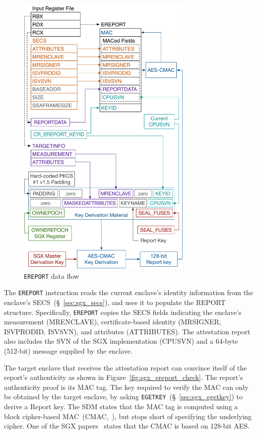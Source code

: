\begin{figure}[hbt]
  \centering
  \includegraphics[width=85mm]{figures/sgx_ereport.pdf}
  \caption{
    \texttt{EREPORT} data flow
  }
  \label{fig:sgx_ereport}
\end{figure}

The \texttt{EREPORT} instruction reads the current enclave's identity
information from the enclave's SECS~(\S~\ref{sec:sgx_secs}), and uses it to
populate the REPORT structure. Specifically, \texttt{EREPORT} copies the
SECS fields indicating the enclave's measurement (MRENCLAVE), certificate-based
identity (MRSIGNER, ISVPRODID, ISVSVN), and attributes (ATTRIBUTES). The
attestation report also includes the SVN of the SGX implementation (CPUSVN)
and a 64-byte (512-bit) message supplied by the enclave.


The target enclave that receives the attestation report can convince itself of
the report's authenticity as shown in Figure~\ref{fig:sgx_ereport_check}. The
report's authenticity proof is its MAC tag. The key required to verify the MAC
can only be obtained by the target enclave, by asking
\texttt{EGETKEY}~(\S~\ref{sec:sgx_egetkey}) to derive a Report key. The SDM
states that the MAC tag is computed using a block cipher-based
MAC~(CMAC,~\cite{fips2005cmac}), but stops short of specifying the underlying
cipher. One of the SGX papers~\cite{anati2013sgx} states that the CMAC is based
on 128-bit AES.

